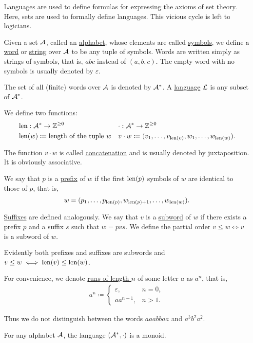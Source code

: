 Languages are used to define formulas for expressing the axioms of set theory. Here, sets are used to formally define languages. This vicious cycle is left to logicians.

\begin{definition}\label{def:language}
  Given a set $\mathcal A$, called an \uline{alphabet}, whose elements are called \uline{symbols}, we define a \uline{word} or \uline{string} over $\mathcal A$ to be any tuple of symbols. Words are written simply as strings of symbols, that is, $abc$ instead of $(a, b, c)$. The empty word with no symbols is usually denoted by $\varepsilon$.

  The set of all (finite) words over $\mathcal A$ is denoted by $\mathcal A^{*}$. A \uline{language} $\mathcal L$ is any subset of $\mathcal A^{*}$.

  We define two functions:
  \begin{align*}
    &\operatorname{len}: \mathcal A^{*} \to \mathbb Z^{\geq 0}
    &&\cdot: \mathcal A^{*} \to \mathbb Z^{\geq 0}
    \\
    &\operatorname{len}(w) \coloneqq \text{length of the tuple } w
    &&v \cdot w \coloneqq (v_1, \ldots, v_{\operatorname{len}(v)}, w_1, \ldots, w_{\operatorname{len}(w)}).
  \end{align*}

  The function $v \cdot w$ is called \uline{concatenation} and is usually denoted by juxtaposition. It is obviously associative.

  We say that $p$ is a \uline{prefix} of $w$ if the first $\operatorname{len}(p)$ symbols of $w$ are identical to those of $p$, that is,
  \begin{align*}
    w = (p_1, \ldots, p_{\operatorname{len}(p)}, w_{\operatorname{len}(p) + 1}, \ldots, w_{\operatorname{len}(w)}).
  \end{align*}

  \uline{Suffixes} are defined analogously. We say that $v$ is a \uline{subword} of $w$ if there exists a prefix $p$ and a suffix $s$ such that $w = pvs$. We define the partial order $v \leq w \iff v$ is a subword of $w$.

  Evidently both prefixes and suffixes are subwords and $v \leq w \iff \operatorname{len}(v) \leq \operatorname{len}(w)$.

  For convenience, we denote \uline{runs of length $n$} of some letter $a$ as $a^n$, that is,
  \begin{align*}
    a^n \coloneqq \begin{cases}
      \varepsilon, &n = 0, \\
      a a^{n-1}, &n > 1.
    \end{cases}
  \end{align*}

  Thus we do not distinguish between the words $aaabbaa$ and $a^3 b^2 a^2$.
\end{definition}

\begin{proposition}\label{thm:set_of_all_words_is_monoid}
  For any alphabet $\mathcal A$, the language $(\mathcal A^{*}, \cdot)$ is a monoid.
\end{proposition}
